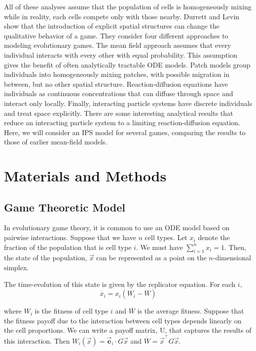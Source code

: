 \documentclass[12pt]{report}
\begin{document}
	
	All of these analyses assume that the population of cells is homogeneously mixing while in reality, each cells compete only with those nearby. Durrett and Levin \cite{Durrett1994} show that the introduction of explicit spatial structures can change the qualitative behavior of a game. They consider four different approaches to modeling evolutionary games. The mean field approach assumes that every individual interacts with every other with equal probability. This assumption gives the benefit of often analytically tractable ODE models. Patch models group individuals into homogeneously mixing patches, with possible migration in between, but no other spatial structure. Reaction-diffusion equations have individuals as continuous concentrations that can diffuse through space and interact only locally. Finally, interacting particle systems have discrete  individuals and treat space explicitly. There are some interesting analytical results that reduce an interacting particle system to a limiting reaction-diffusion equation. Here, we will consider an IPS model for several games, comparing the results to those of earlier mean-field models. \\
	
	
	
	
	

	
\chapter*{Materials and Methods}
\section*{Game Theoretic Model}
	In evolutionary game theory, it is common to use an ODE model based on pairwise interactions. Suppose that we have $n$ cell types. Let $x_i$ denote the fraction of the population that is cell type $i$. We must have $\sum_{i=1}^n x_i = 1$. Then, the state of the population, $\vec{x}$ can be represented as a point on the $n$-dimensional simplex. 
	
	The time-evolution of this state is given by the replicator equation. For each $i$, 
	$$\dot{x_i} = x_i (W_i - \overline{W})$$
	
	where $W_i$ is the fitness of cell type $i$ and $\overline{W}$ is the average fitness. Suppose that the fitness payoff due to the interaction between cell types depends linearly on the cell proportions. We can write a payoff matrix, U, that captures the results of this interaction. Then $W_i(\vec{x}) = \vec{\textbf{e}}_i \cdot G\vec{x} $ and $\overline{W} = \vec{x}^\top G \vec{x}$.
	
\end{document}
